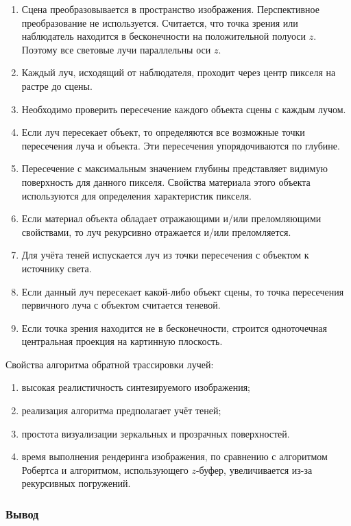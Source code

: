 \begin{enumerate}[label=\arabic*)]
	\item Сцена преобразовывается в пространство изображения. Перспективное преобразование не используется. Считается, что точка зрения или наблюдатель находится в бесконечности на положительной полуоси $z$. Поэтому все световые лучи параллельны оси $z$. 
	\item Каждый луч, исходящий от наблюдателя, проходит через центр пикселя на растре до сцены.
	\item Необходимо проверить пересечение каждого объекта сцены с каждым лучом.
	\item Если луч пересекает объект, то определяются все возможные точки пересечения луча и объекта. Эти пересечения упорядочиваются по глубине.
	\item Пересечение с максимальным значением глубины представляет видимую поверхность для данного пикселя. Свойства материала этого объекта используются для определения характеристик пикселя.
	\item Если материал объекта обладает отражающими и/или преломляющими свойствами, то луч рекурсивно отражается и/или преломляется.
	\item Для учёта теней испускается луч из точки пересечения с объектом к источнику света.
	\item Если данный луч пересекает какой-либо объект сцены, то точка пересечения первичного луча с объектом считается теневой.
	\item Если точка зрения находится не в бесконечности, строится одноточечная центральная проекция на картинную плоскость.
\end{enumerate}


Свойства алгоритма обратной трассировки лучей:
\begin{enumerate}[label=\arabic*)]
	\item высокая реалистичность синтезируемого изображения;
	\item реализация алгоритма предполагает учёт теней;
	\item простота визуализации зеркальных и прозрачных поверхностей.
	\item время выполнения рендеринга изображения, по сравнению с алгоритмом Робертса и алгоритмом, использующего $z$-буфер, увеличивается из-за рекурсивных погружений.
\end{enumerate}

\subsubsection{Вывод}

